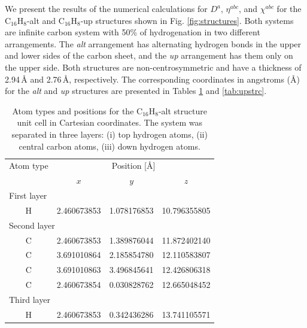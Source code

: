 \documentclass[pss]{wiley2sp} %
\begin{document}
We present the results of the numerical calculations for {$D^{a}$}, {$\eta^{abc}$}, and $\chi^{abc}$ for the C$_{16}$H$_{8}$-alt and C$_{16}$H$_{8}$-up structures shown in Fig. \ref{fig:structures}. Both systems are infinite carbon system with 50\% of hydrogenation in two different arrangements. The \emph{alt} arrangement has alternating hydrogen bonds in the upper and lower sides of the carbon sheet, and the \emph{up} arrangement has them only on the upper side. Both structures are non-centrosymmetric and have a thickness of 2.94\,{\AA} and 2.76\,{\AA}, respectively. The corresponding coordinates in angstroms (\AA) for the \emph{alt} and \emph{up} structures are presented in Tables \ref{tab:altstrc} and \ref{tab:upstrc}.
\begin{table}[t]
  \begin{tabular}{cccc}
  \hline
  Atom type &  \multicolumn{3}{c}{Position [\AA] } \\
  \cline{2-4}
  & $x$ & $y$ & $z$ \\
  \hline
  \multicolumn{2}{l}{First layer}\\
H & 2.460673853 & 1.078176853 & 10.796355805 \\
  \multicolumn{2}{l}{Second layer}\\
C & 2.460673853 & 1.389876044 & 11.872402140 \\
C & 3.691010864 & 2.185854780 & 12.110583807 \\
C & 3.691010863 & 3.496845641 & 12.426806318 \\
C & 2.460673854 & 0.030828762 & 12.665048452 \\
  \multicolumn{2}{l}{Third layer}\\
H & 2.460673853 & 0.342436286 & 13.741105571 \\
  \hline
  \end{tabular}
  \caption[]{%
  Atom types and positions for the C$_{16}$H$_{8}$-alt structure unit cell in Cartesian coordinates. The system was separated in three layers: (i) top hydrogen atoms, (ii) central carbon atoms, (iii) down hydrogen atoms. }
  \label{tab:altstrc}
\end{table}
\end{document}
